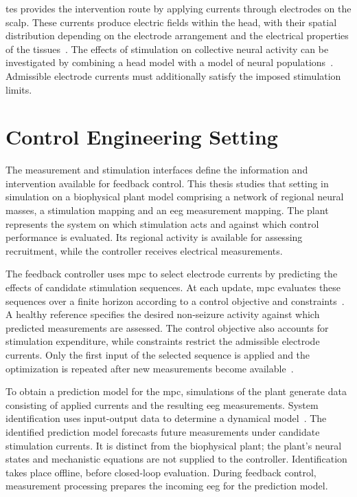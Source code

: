 \Ac{tes} provides the intervention route by applying currents through electrodes on the scalp.
These currents produce electric fields within the head, with their spatial distribution depending on the electrode arrangement and the electrical properties of the tissues~\cite{Huang2019}.
The effects of stimulation on collective neural activity can be investigated by combining a head model with a model of neural populations~\cite{Merlet2013,Kunze2016}.
Admissible electrode currents must additionally satisfy the imposed stimulation limits.

\section{Control Engineering Setting}
\label{sec:control_engineering_setting}

The measurement and stimulation interfaces define the information and intervention available for feedback control.
This thesis studies that setting in simulation on a biophysical plant model comprising a network of regional neural masses, a stimulation mapping and an \ac{eeg} measurement mapping.
The plant represents the system on which stimulation acts and against which control performance is evaluated.
Its regional activity is available for assessing recruitment, while the controller receives electrical measurements.

The feedback controller uses \ac{mpc} to select electrode currents by predicting the effects of candidate stimulation sequences.
At each update, \ac{mpc} evaluates these sequences over a finite horizon according to a control objective and constraints~\cite{Rawlings2017}.
A healthy reference specifies the desired non-seizure activity against which predicted measurements are assessed.
The control objective also accounts for stimulation expenditure, while constraints restrict the admissible electrode currents.
Only the first input of the selected sequence is applied and the optimization is repeated after new measurements become available~\cite{Rawlings2017}.

To obtain a prediction model for the \ac{mpc}, simulations of the plant generate data consisting of applied currents and the resulting \ac{eeg} measurements.
System identification uses input-output data to determine a dynamical model~\cite{Ljung1999}.
The identified prediction model forecasts future measurements under candidate stimulation currents.
It is distinct from the biophysical plant; the plant's neural states and mechanistic equations are not supplied to the controller.
Identification takes place offline, before closed-loop evaluation.
During feedback control, measurement processing prepares the incoming \ac{eeg} for the prediction model.

